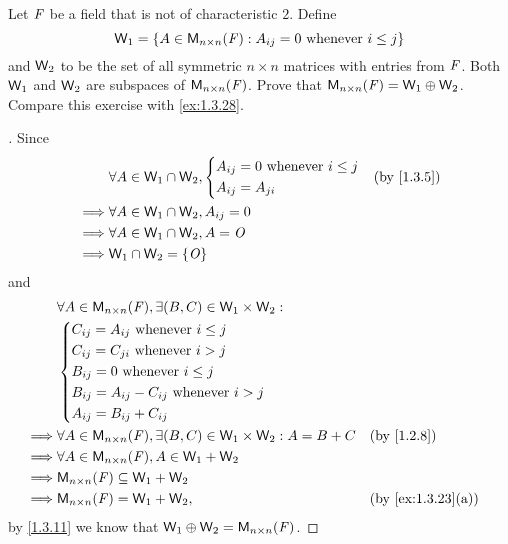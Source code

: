 \begin{ex}\label{ex:1.3.29}
	Let \(\mathit{F}\) be a field that is not of characteristic \(2\).
	Define
	\[
		\W_1 = \set{A \in \ms[n][n][\F] : A_{i j} = 0 \text{ whenever } i \leq j}
	\]
	and \(\mathsf{W}_2\) to be the set of all symmetric \(n \times n\) matrices with entries from \(\mathit{F}\).
	Both \(\mathsf{W}_1\) and \(\mathsf{W}_2\) are subspaces of \(\ms[n][n][\F]\).
	Prove that \(\ms[n][n][\F] = \W_1 \oplus \W_2\).
	Compare this exercise with \cref{ex:1.3.28}.
\end{ex}

\begin{proof}[]
	Since
	\begin{align*}
		         & \forall A \in \W_1 \cap \W_2, \begin{dcases}
			                                         A_{i j} = 0 \text{ whenever } i \leq j \\
			                                         A_{i j} = A_{j i}
		                                         \end{dcases} &  & \by{1.3.5} \\
		\implies & \forall A \in \W_1 \cap \W_2, A_{i j} = 0                            \\
		\implies & \forall A \in \W_1 \cap \W_2, A = \zm                                \\
		\implies & \W_1 \cap \W_2 = \set{\zm}
	\end{align*}
	and
	\begin{align*}
		         & \forall A \in \ms[n][n][\F], \exists (B, C) \in \W_1 \times \W_2 :                                  \\
		         & \begin{dcases}
			           C_{i j} = A_{i j} \text{ whenever } i \leq j        \\
			           C_{i j} = C_{j i} \text{ whenever } i > j           \\
			           B_{i j} = 0 \text{ whenever } i \leq j              \\
			           B_{i j} = A_{i j} - C_{i j} \text{ whenever } i > j \\
			           A_{i j} = B_{i j} + C_{i j}
		           \end{dcases}                                                 \\
		\implies & \forall A \in \ms[n][n][\F], \exists (B, C) \in \W_1 \times \W_2 : A = B + C &  & \by{1.2.8}        \\
		\implies & \forall A \in \ms[n][n][\F], A \in \W_1 + \W_2                                                      \\
		\implies & \ms[n][n][\F] \subseteq \W_1 + \W_2                                                                 \\
		\implies & \ms[n][n][\F] = \W_1 + \W_2,                                                 &  & \by{ex:1.3.23}[a]
	\end{align*}
	by \cref{1.3.11} we know that \(\W_1 \oplus \W_2 = \ms[n][n][\F]\).
\end{proof}

